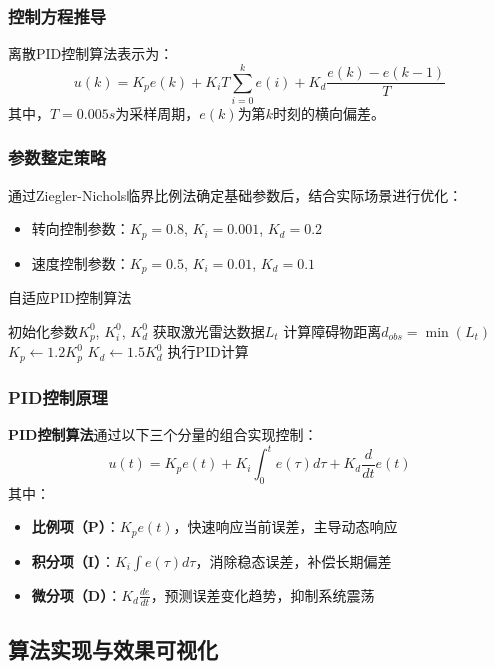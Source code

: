 \subsubsection{控制方程推导}
离散PID控制算法表示为：
\begin{equation}
	u(k) = K_p e(k) + K_i T \sum_{i=0}^k e(i) + K_d \frac{e(k)-e(k-1)}{T}
\end{equation}
其中，$T=0.005s$为采样周期，$e(k)$为第$k$时刻的横向偏差。

\subsubsection{参数整定策略}
通过Ziegler-Nichols临界比例法确定基础参数后，结合实际场景进行优化：
\begin{itemize}
	\item 转向控制参数：$K_p=0.8$, $K_i=0.001$, $K_d=0.2$
	\item 速度控制参数：$K_p=0.5$, $K_i=0.01$, $K_d=0.1$
\end{itemize}

\begin{algorithm}[H]
	\caption{自适应PID控制算法}
	\begin{algorithmic}[1]
	\STATE 初始化参数$K_p^0$, $K_i^0$, $K_d^0$  %
 	\STATE 获取激光雷达数据$L_t$
  	\STATE 计算障碍物距离$d_{obs} = \min(L_t)$
    	\STATE $K_p \gets 1.2K_p^0$
    	\STATE $K_d \gets 1.5K_d^0$
  	\ENDIF
  	\STATE 执行PID计算
	\ENDWHILE
	\end{algorithmic}
\end{algorithm}

\subsubsection{PID控制原理}
	\textbf{PID控制算法}通过以下三个分量的组合实现控制：
		\[
		u(t) = K_p e(t) + K_i \int_0^t e(\tau) d\tau + K_d \frac{d}{dt} e(t)
		\]
其中：
\begin{itemize}
    \item \textbf{比例项（P）}：$K_p e(t)$，快速响应当前误差，主导动态响应
    \item \textbf{积分项（I）}：$K_i \int e(\tau)d\tau$，消除稳态误差，补偿长期偏差
    \item \textbf{微分项（D）}：$K_d \frac{de}{dt}$，预测误差变化趋势，抑制系统震荡
\end{itemize}

\subsection{算法实现与效果可视化}

